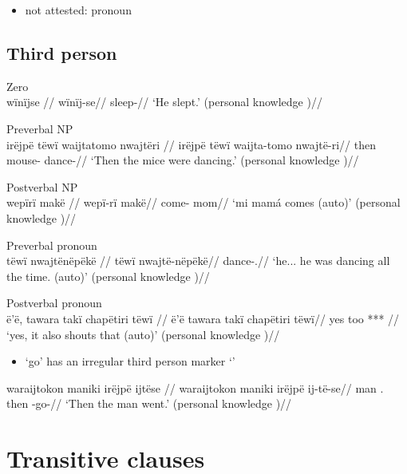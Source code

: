 \documentclass{memoir}
\begin{document}
\begin{itemize}
\tightlist
\item
  not attested: pronoun
\end{itemize}

\subsection{Third person}

\ex  Zero  \\\label{ctorat-6}
\begingl \glpreamble wïnïjse //
\gla wïnïj-se//
\glb sleep-//
\glft ‘He slept.’ (personal knowledge
)//
\endgl
\xe

\ex  Preverbal NP  \\\label{ctorat-16}
\begingl \glpreamble irëjpë tëwï waijtatomo nwajtëri //
\gla irëjpë tëwï waijta-tomo nwajtë-ri//
\glb then  mouse- dance-//
\glft ‘Then the mice were dancing.’ (personal knowledge
)//
\endgl
\xe

\ex  Postverbal NP  \\\label{histgrme-83}
\begingl \glpreamble wepïrï makë //
\gla wepï-rï makë//
\glb come- mom//
\glft ‘mi mamá comes (auto)’ (personal knowledge
)//
\endgl
\xe

\ex  Preverbal pronoun  \\\label{desccasagrme-28}
\begingl \glpreamble tëwï nwajtënëpëkë //
\gla tëwï nwajtë-nëpëkë//
\glb {} dance-.//
\glft ‘he... he was dancing all the time. (auto)’ (personal knowledge
)//
\endgl
\xe

\ex  Postverbal pronoun  \\\label{convfemgrme-113}
\begingl \glpreamble ë'ë, tawara takï chapëtiri tëwï //
\gla ë'ë tawara takï chapëtiri tëwï//
\glb yes too  *** //
\glft ‘yes, it also shouts that (auto)’ (personal knowledge
)//
\endgl
\xe

\begin{itemize}
\tightlist
\item
   `go' has an irregular third person marker  `'
\end{itemize}

\ex \label{ctorat-45}
\begingl \glpreamble waraijtokon maniki irëjpë ijtëse //
\gla waraijtokon maniki irëjpë ij-të-se//
\glb man . then -go-//
\glft ‘Then the man went.’ (personal knowledge
)//
\endgl
\xe

\section{Transitive clauses}
\end{document}
